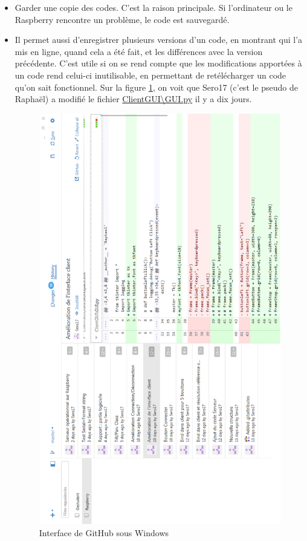 \documentclass[12pt,a4paper]{report}
\begin{document}
\begin{itemize}
\item Garder une copie des codes. C'est la raison principale. Si l'ordinateur ou le Raspberry rencontre un problème, le code est sauvegardé.
\item Il permet aussi d'enregistrer plusieurs versions d'un code, en montrant qui l'a mis en ligne, quand cela a été fait, et les différences avec la version précédente. C'est utile si on se rend compte que les modifications apportées à un code rend celui-ci inutilisable, en permettant de retélécharger un code qu'on sait fonctionnel. Sur la figure \ref{GitHub}, on voit que Sero17 (c'est le pseudo de Raphaël) a modifié le fichier \url{ClientGUI\GUI.py} il y a dix jours.

\begin{figure}[hf!]
\center
\includegraphics[scale=0.7]{images/GitHub.png}
\caption{Interface de GitHub sous Windows}
\label{GitHub}
\end{figure}

\end{itemize}
\end{document}

